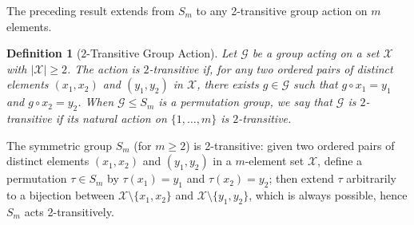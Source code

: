 \documentclass[11pt]{article}
\newtheorem{definition}{Definition}
\begin{document}
The preceding result extends from \(S_m\) to any 2-transitive group action on \(m\) elements.

\begin{definition}[$2$-Transitive Group Action]
Let \(\mathcal G\) be a group acting on a set \(\mathcal X\) with \(|\mathcal X| \ge 2\). The action is $2$-transitive if, for any two ordered pairs of distinct elements \((x_1,x_2)\) and \((y_1,y_2)\) in \(\mathcal X\), there exists \(g\in\mathcal G\) such that \(g\circ x_1=y_1\) and \(g\circ x_2=y_2\). When \(\mathcal G\le S_m\) is a permutation group, we say that \(\mathcal G\) is $2$-transitive if its natural action on \(\{1,\ldots,m\}\) is $2$-transitive.
\end{definition}  

The symmetric group \(S_m\) (for \(m\ge2\)) is 2-transitive: given two ordered pairs of distinct elements \((x_1,x_2)\) and \((y_1,y_2)\) in a \(m\)-element set \(\mathcal X\), define a permutation \(\tau\in S_m\) by \(\tau(x_1)=y_1\) and \(\tau(x_2)=y_2\); then extend \(\tau\) arbitrarily to a bijection between \(\mathcal X\setminus\{x_1,x_2\}\) and \(\mathcal X\setminus\{y_1,y_2\}\), which is always possible, hence \(S_m\) acts 2-transitively. 
\end{document}
